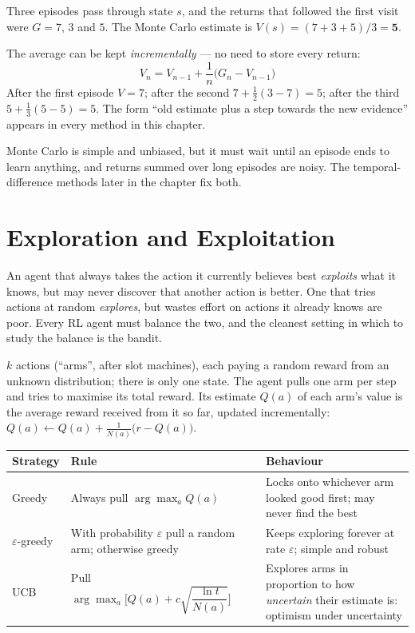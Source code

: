 \begin{worked}
Three episodes pass through state $s$, and the returns that followed the first visit
were $G = 7$, $3$ and $5$. The Monte Carlo estimate is $V(s) = (7 + 3 + 5)/3 =
\mathbf{5}$.

\smallskip
The average can be kept \emph{incrementally} --- no need to store every return:
\[
V_{n} = V_{n-1} + \frac{1}{n}\big(G_n - V_{n-1}\big)
\]
After the first episode $V = 7$; after the second $7 + \tfrac{1}{2}(3 - 7) = 5$; after
the third $5 + \tfrac{1}{3}(5 - 5) = 5$. The form ``old estimate plus a step towards
the new evidence'' appears in every method in this chapter.
\end{worked}

Monte Carlo is simple and unbiased, but it must wait until an episode ends to learn
anything, and returns summed over long episodes are noisy. The temporal-difference
methods later in the chapter fix both.

\section{Exploration and Exploitation}

An agent that always takes the action it currently believes best \emph{exploits}
what it knows, but may never discover that another action is better. One that tries
actions at random \emph{explores}, but wastes effort on actions it already knows are
poor. Every RL agent must balance the two, and the cleanest setting in which to study
the balance is the bandit.

\begin{definitionbox}
$k$ actions (``arms'', after slot machines), each paying a random reward from an
unknown distribution; there is only one state. The agent pulls one arm per step and
tries to maximise its total reward. Its estimate $Q(a)$ of each arm's value is the
average reward received from it so far, updated incrementally:
$Q(a) \leftarrow Q(a) + \tfrac{1}{N(a)}\big(r - Q(a)\big)$.
\end{definitionbox}

\begin{longtable}{@{}L{2.8cm}L{6.4cm}L{5.8cm}@{}}
\toprule
{}
\textbf{Strategy} & \textbf{Rule} & \textbf{Behaviour} \\
\midrule
\endhead
Greedy & Always pull $\arg\max_a Q(a)$ & Locks onto whichever arm looked good first;
may never find the best \\
$\varepsilon$-greedy & With probability $\varepsilon$ pull a random arm; otherwise
greedy & Keeps exploring forever at rate $\varepsilon$; simple and robust \\
UCB & Pull $\arg\max_a \Big[Q(a) + c\sqrt{\dfrac{\ln t}{N(a)}}\Big]$ & Explores arms in
proportion to how \emph{uncertain} their estimate is: optimism under uncertainty \\
\bottomrule
\end{longtable}

